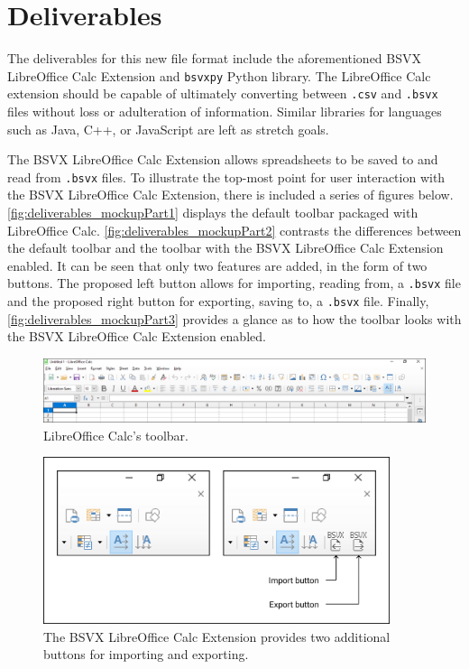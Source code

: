 \documentclass[10pt]{article}
\begin{document}
\section*{Deliverables}

The deliverables for this new file format include the aforementioned BSVX LibreOffice Calc Extension and \texttt{bsvxpy} Python library.
The LibreOffice Calc extension should be capable of ultimately converting between \texttt{.csv} and \texttt{.bsvx} files without loss or adulteration of information.
Similar libraries for languages such as Java, C++, or JavaScript are left as stretch goals.

\indent{}
The BSVX LibreOffice Calc Extension allows spreadsheets to be saved to and read from \texttt{.bsvx} files.
To illustrate the top-most point for user interaction with the BSVX LibreOffice Calc Extension, there is included a series of figures below. 
\autoref{fig:deliverables_mockupPart1} displays the default toolbar packaged with LibreOffice Calc.
\autoref{fig:deliverables_mockupPart2} contrasts the differences between the default toolbar and the toolbar with the BSVX LibreOffice Calc Extension enabled.
It can be seen that only two features are added, in the form of two buttons.
The proposed left button allows for importing, reading from, a \texttt{.bsvx} file and the proposed right button for exporting, saving to, a \texttt{.bsvx} file.
Finally, \autoref{fig:deliverables_mockupPart3} provides a glance as to how the toolbar looks with the BSVX LibreOffice Calc Extension enabled.

\begin{figure}[H]
\centering
\includegraphics[width=\textwidth]{figures/mockupPart1.png}
\caption{LibreOffice Calc's toolbar.}
\label{fig:deliverables_mockupPart1}
\end{figure}

\begin{figure}[H]
\centering
\includegraphics[width=4in]{figures/mockupPart2.png}
\caption{The BSVX LibreOffice Calc Extension provides two additional buttons for importing and exporting.}
\label{fig:deliverables_mockupPart2}
\end{figure}
\end{document}
